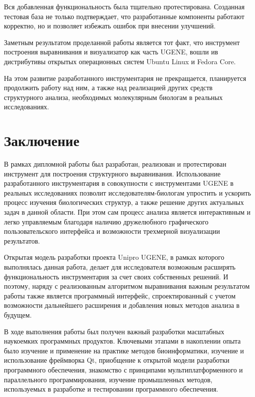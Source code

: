 \documentclass[a4paper, 12pt, titlepage, utf8]{extarticle}
\let\oldsection\section         %
\renewcommand{\section}{\newpage\oldsection}
\begin{document}
Вся добавленная функциональность была тщательно протестирована. Созданная тестовая база не только подтверждает, что разработанные компоненты работают корректно, но и позволяет избежать ошибок при внесении улучшений.

Заметным результатом проделанной работы является тот факт, что инструмент построения выравнивания и визуализатор как часть UGENE, вошли ив дистрибутивы открытых операционных систем Ubuntu Linux и Fedora Core.

На этом развитие разработанного инструментария не прекращается, планируется продолжить работу над ним, а также над реализацией других средств структурного анализа, необходимых молекулярным биологам в реальных исследованиях.



\section{Заключение}
В рамках дипломной работы был разработан, реализован и протестирован инструмент для построения структурного выравнивания. Использование разработанного инструментария в совокупности с инструментами UGENE в реальных исследованиях позволит исследователям-биологам упростить и ускорить процесс изучения биологических структур, а также решение других актуальных задач в данной области. При этом сам процесс анализа является интерактивным и легко управляемым благодаря наличию дружелюбного графического пользовательского интерфейса и возможности трехмерной визуализации результатов.

Открытая модель разработки проекта Unipro UGENE, в рамках которого выполнялась данная работа, делает для исследователя возможным расширять функциональность инструментария за счет своих собственных решений. И поэтому, наряду с реализованным алгоритмом выравнивания важным результатом работы также является программный интерфейс, спроектированный с учетом возможности дальнейшего расширения и добавления новых методов анализа в будущем.

В ходе выполнения работы был получен важный разработки масштабных наукоемких программных продуктов. Ключевыми этапами в накоплении опыта было изучение и применение на практике методов биоинформатики, изучение и использование фреймворка Qt, приобщение к открытой модели разработки программного обеспечения, знакомство с принципами мультиплатформенного и параллельного программирования, изучение промышленных методов, используемых в разработке и тестировании программного обеспечения.
\end{document}
